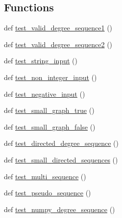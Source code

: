 \subsection*{Functions}
\begin{DoxyCompactItemize}
\item 
def \hyperlink{namespacenetworkx_1_1algorithms_1_1tests_1_1test__graphical_ad9d9300ae3513cd82a21e76253682db6}{test\+\_\+valid\+\_\+degree\+\_\+sequence1} ()
\item 
def \hyperlink{namespacenetworkx_1_1algorithms_1_1tests_1_1test__graphical_a205a0d15e42ec031aa2986897bedf5d4}{test\+\_\+valid\+\_\+degree\+\_\+sequence2} ()
\item 
def \hyperlink{namespacenetworkx_1_1algorithms_1_1tests_1_1test__graphical_afe13eb0ba773375cdbdfc7e8cf37c528}{test\+\_\+string\+\_\+input} ()
\item 
def \hyperlink{namespacenetworkx_1_1algorithms_1_1tests_1_1test__graphical_a978e125d1bae3d445769a73bd3153d30}{test\+\_\+non\+\_\+integer\+\_\+input} ()
\item 
def \hyperlink{namespacenetworkx_1_1algorithms_1_1tests_1_1test__graphical_ae1fc246cc375515fa79b4332c5fb9075}{test\+\_\+negative\+\_\+input} ()
\item 
def \hyperlink{namespacenetworkx_1_1algorithms_1_1tests_1_1test__graphical_ac59bfae40560d3b60a56147a3597e873}{test\+\_\+small\+\_\+graph\+\_\+true} ()
\item 
def \hyperlink{namespacenetworkx_1_1algorithms_1_1tests_1_1test__graphical_a6478de44b2f7c42e4a4f9a51850cdbe8}{test\+\_\+small\+\_\+graph\+\_\+false} ()
\item 
def \hyperlink{namespacenetworkx_1_1algorithms_1_1tests_1_1test__graphical_a0ab07927157d4c1fd6ff9bdf3b1d55d8}{test\+\_\+directed\+\_\+degree\+\_\+sequence} ()
\item 
def \hyperlink{namespacenetworkx_1_1algorithms_1_1tests_1_1test__graphical_af9f3e0db3aa588a8df6aa7f0733db0b7}{test\+\_\+small\+\_\+directed\+\_\+sequences} ()
\item 
def \hyperlink{namespacenetworkx_1_1algorithms_1_1tests_1_1test__graphical_afdb2605b6a23193c32a1989c6d9403f0}{test\+\_\+multi\+\_\+sequence} ()
\item 
def \hyperlink{namespacenetworkx_1_1algorithms_1_1tests_1_1test__graphical_ad7929d21b24a9891978c956752e3e2f3}{test\+\_\+pseudo\+\_\+sequence} ()
\item 
def \hyperlink{namespacenetworkx_1_1algorithms_1_1tests_1_1test__graphical_ac79e62b756c9169a722400412610b42f}{test\+\_\+numpy\+\_\+degree\+\_\+sequence} ()
\end{DoxyCompactItemize}


